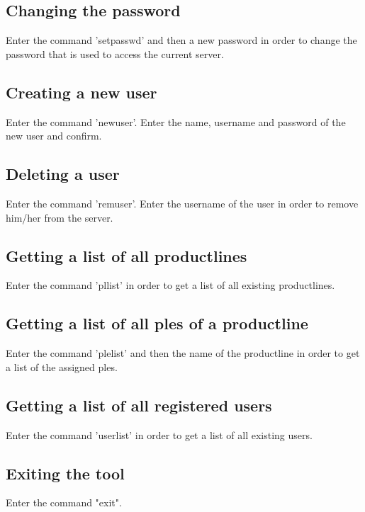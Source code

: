 \subsection{Changing the password}
Enter the command 'setpasswd' and then a new password in order to change the password that is used to access
the current server.

\subsection{Creating a new user}
Enter the command 'newuser'. Enter the name, username and password of the new user and confirm.

\subsection{Deleting a user}
Enter the command 'remuser'. Enter the username of the user in order to remove him/her from the server.

\subsection{Getting a list of all productlines}
Enter the command 'pllist' in order to get a list of all existing productlines.

\subsection{Getting a list of all ples of a productline}
Enter the command 'plelist' and then the name of the productline in order to get a list
 of the assigned ples.
 
\subsection{Getting a list of all registered users}
Enter the command 'userlist' in order to get a list of all existing users.

\subsection{Exiting the tool}
Enter the command "exit".
